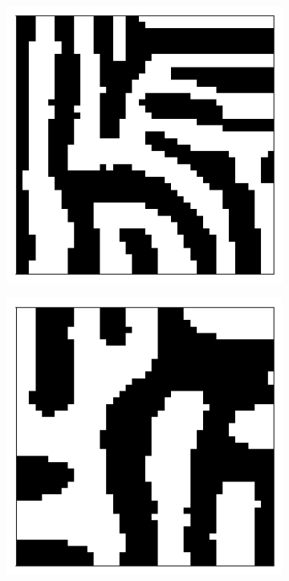 \documentclass{article}
\begin{document}
\begin{figure}[h]
	\centering
	\begin{subfigure}[t]{0.23\linewidth}
		\centering
		\includegraphics[width = 1.0\linewidth, trim={5 5 5 10}, clip=true]{figures/N20M40l05d05_2_dominance.png}
		\label{fig:dom05}	
	\end{subfigure}%
	\hspace{0.03\linewidth}
	\begin{subfigure}[t]{0.23\linewidth}
		\centering
		\includegraphics[width = 1.0\linewidth, trim={5 5 5 10}, clip=true]{figures/N20M40l075d05_2_dominance.png}

\end{subfigure}
\end{figure}
\end{document}

